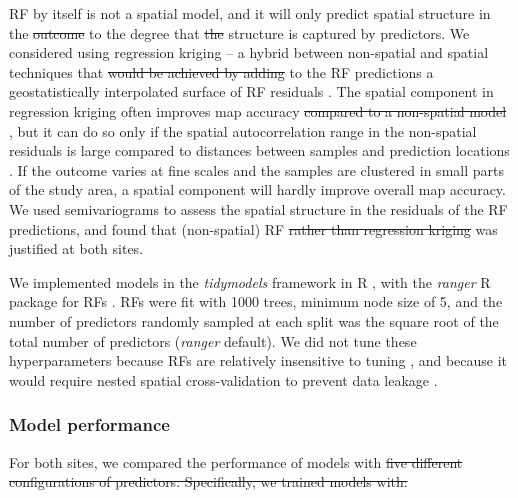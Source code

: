 \documentclass[soil, manuscript]{copernicus}
\providecommand{\DIFadd}[1]{{\protect\color{blue}\uwave{#1}}} %
\providecommand{\DIFdel}[1]{{\protect\color{red}\sout{#1}}}                      %
\providecommand{\DIFaddbegin}{} %
\providecommand{\DIFaddend}{} %
\providecommand{\DIFdelbegin}{} %
\providecommand{\DIFdelend}{} %
\begin{document}
RF by itself is not a spatial model, and it will only predict spatial structure in the \DIFdelbegin \DIFdel{outcome }\DIFdelend \DIFaddbegin \DIFadd{peat depth }\DIFaddend to the degree that \DIFdelbegin \DIFdel{the }\DIFdelend \DIFaddbegin \DIFadd{spatial }\DIFaddend structure is captured by predictors.
We considered using regression kriging -- a hybrid between non-spatial and spatial techniques that \DIFdelbegin \DIFdel{would be achieved by adding }\DIFdelend \DIFaddbegin \DIFadd{adds }\DIFaddend to the RF predictions a geostatistically interpolated surface of RF residuals \citep{henglGenericFrameworkSpatial2004}.
The spatial component in regression kriging often improves map accuracy \DIFdelbegin \DIFdel{compared to a non-spatial model }\DIFdelend \citep{beguinPredictingSoilProperties2017, lamichhaneDigitalSoilMapping2019, mollaMachineLearningGeostatistical2023}, but it can do so only if the spatial autocorrelation range in the non-spatial residuals is large compared to distances between samples and prediction locations \citep{henglGenericFrameworkSpatial2004, szaboMappingSoilHydraulic2019, takoutsingComparingPredictionPerformance2022}.
If the outcome varies at fine scales and the samples are clustered in small parts of the study area, a spatial component will hardly improve overall map accuracy.
We used semivariograms to assess the spatial structure in the residuals of the RF predictions, and found that (non-spatial) RF \DIFdelbegin \DIFdel{rather than regression kriging }\DIFdelend was justified at both sites.

We implemented models in the \emph{tidymodels} framework in R \citep{kuhnTidymodelsCollectionPackages2020}, with the \emph{ranger} R package for RFs \citep[v0.16,][]{wrightRangerFastImplementation2017}.
RFs were fit with 1000 trees, minimum node size of 5, and the number of predictors randomly sampled at each split was the square root of the total number of predictors (\emph{ranger} default).
We did not tune these hyperparameters because RFs are relatively insensitive to tuning \citep{probstHyperparametersTuningStrategies2019}, and because it would require nested spatial cross-validation to prevent data leakage \citep{schratzHyperparameterTuningPerformance2019}.

\subsubsection{Model performance}

For both sites, we compared the performance of models with \DIFdelbegin \DIFdel{five different configurations of predictors.
Specifically, we trained models with: }%
\end{document}
